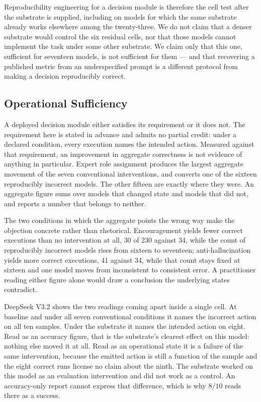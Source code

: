 Reproducibility engineering for a decision module is therefore the cell test after
the substrate is supplied, including on models for which the same substrate already
works elsewhere among the twenty-three. We do not claim that a denser substrate would
control the six residual cells, nor that those models cannot implement the task under
some other substrate. We claim only that this one, sufficient for seventeen models,
is not sufficient for them --- and that recovering a published metric from an
underspecified prompt is a different protocol from making a decision reproducibly
correct.


\subsection{Operational Sufficiency}
\label{sec:operational-sufficiency}

A deployed decision module either satisfies its requirement or it does not. The
requirement here is stated in advance and admits no partial credit: under a declared
condition, every execution names the intended action. Measured against that
requirement, an improvement in aggregate correctness is not evidence of anything in
particular. Expert role assignment produces the largest aggregate movement of the
seven conventional interventions, and converts one of the sixteen reproducibly
incorrect models. The other fifteen are exactly where they were. An aggregate figure
sums over models that changed state and models that did not, and reports a number
that belongs to neither.

The two conditions in which the aggregate points the wrong way make the objection
concrete rather than rhetorical. Encouragement yields fewer correct executions than
no intervention at all, 30 of 230 against 34, while the count of reproducibly
incorrect models rises from sixteen to seventeen; anti-hallucination yields more
correct executions, 41 against 34, while that count stays fixed at sixteen and one
model moves from inconsistent to consistent error. A practitioner reading either
figure alone would draw a conclusion the underlying states contradict.

DeepSeek V3.2 shows the two readings coming apart inside a single cell. At baseline
and under all seven conventional conditions it names the incorrect action on all ten
samples. Under the substrate it names the intended action on eight. Read as an
accuracy figure, that is the substrate's clearest effect on this model: nothing else
moved it at all. Read as an operational state it is a failure of the same
intervention, because the emitted action is still a function of the sample and the
eight correct runs license no claim about the ninth. The substrate worked on this
model as an evaluation intervention and did not work as a control. An accuracy-only
report cannot express that difference, which is why $8/10$ reads there as a success.


